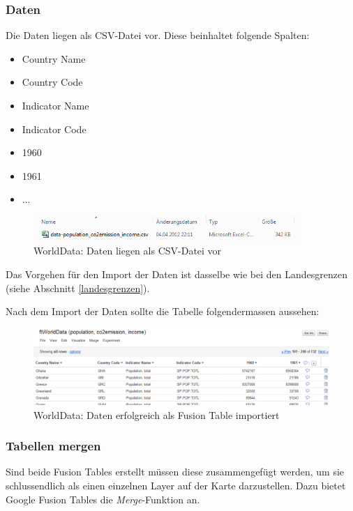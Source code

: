 \subsubsection{Daten}
Die Daten liegen als CSV-Datei vor. Diese beinhaltet folgende Spalten:
\begin{itemize}
\item Country Name
\item Country Code
\item Indicator Name
\item Indicator Code
\item 1960
\item 1961
\item ...
\end{itemize}

\begin{figure}[H]
	\centering
	\includegraphics[width=0.9\textwidth]{images/usecase1-worlddata/documentation/worlddata-data_csv}
	\caption{WorldData: Daten liegen als CSV-Datei vor}
	\label{worlddata-data_csv}
\end{figure}

Das Vorgehen für den Import der Daten ist dasselbe wie bei den Landesgrenzen (siehe Abschnitt \ref{landesgrenzen}).

Nach dem Import der Daten sollte die Tabelle folgendermassen aussehen:

\begin{figure}[H]
	\centering
	\includegraphics[width=\textwidth]{images/usecase1-worlddata/documentation/worlddata-data_import_done}
	\caption{WorldData: Daten erfolgreich als Fusion Table importiert}
	\label{worlddata-data_import_done}
\end{figure}

\subsubsection{Tabellen mergen}
Sind beide Fusion Tables erstellt müssen diese zusammengefügt werden, um sie schlussendlich als einen einzelnen Layer auf der Karte darzustellen. Dazu bietet Google Fusion Tables die \emph{Merge}-Funktion an. 

